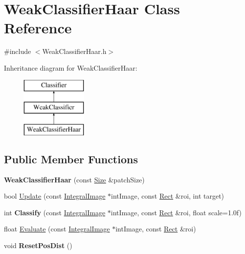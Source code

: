 \hypertarget{classWeakClassifierHaar}{}\section{Weak\+Classifier\+Haar Class Reference}
\label{classWeakClassifierHaar}


{\ttfamily \#include $<$Weak\+Classifier\+Haar.\+h$>$}

Inheritance diagram for Weak\+Classifier\+Haar\+:\begin{figure}[H]
\begin{center}
\leavevmode
\includegraphics[height=3.000000cm]{classWeakClassifierHaar}
\end{center}
\end{figure}
\subsection*{Public Member Functions}
\begin{DoxyCompactItemize}
\item 
\hypertarget{classWeakClassifierHaar_a5897c0e554cb8e3dd0cb001bb76a3c93}{}{\bfseries Weak\+Classifier\+Haar} (const \hyperlink{classSize}{Size} \&patch\+Size)\label{classWeakClassifierHaar_a5897c0e554cb8e3dd0cb001bb76a3c93}

\item 
bool \hyperlink{classWeakClassifierHaar_aa8dc6734dc435c246d9605aceea2c9a7}{Update} (const \hyperlink{classIntegralImage}{Integral\+Image} $\ast$int\+Image, const \hyperlink{classRect}{Rect} \&roi, int target)
\item 
\hypertarget{classWeakClassifierHaar_a2b7ad8b6691f6739ebe75c5301fa252b}{}int {\bfseries Classify} (const \hyperlink{classIntegralImage}{Integral\+Image} $\ast$int\+Image, const \hyperlink{classRect}{Rect} \&roi, float scale=1.\+0f)\label{classWeakClassifierHaar_a2b7ad8b6691f6739ebe75c5301fa252b}

\item 
float \hyperlink{classWeakClassifierHaar_a5880dbf4a75a29e61e32903faef1dae6}{Evaluate} (const \hyperlink{classIntegralImage}{Integral\+Image} $\ast$int\+Image, const \hyperlink{classRect}{Rect} \&roi)
\item 
\hypertarget{classWeakClassifierHaar_ac577e6b2c75eb48bc93068966c522f3f}{}void {\bfseries Reset\+Pos\+Dist} ()\label{classWeakClassifierHaar_ac577e6b2c75eb48bc93068966c522f3f}

\end{DoxyCompactItemize}


